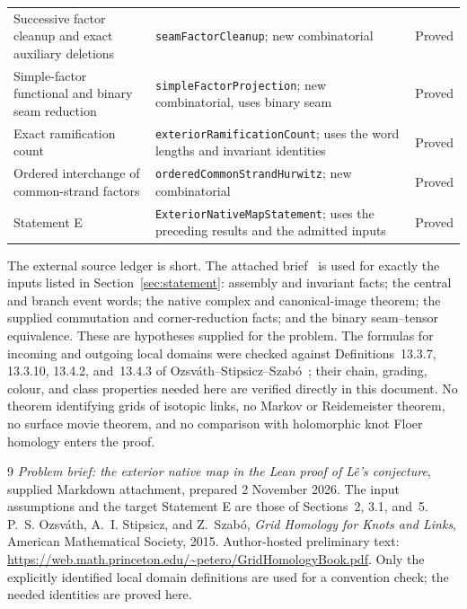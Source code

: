 \documentclass[11pt,a4paper]{article}
\theoremstyle{remark}
\begin{document}
\begin{longtable}{>{\raggedright\arraybackslash}p{}>{\raggedright\arraybackslash}p{}>{\raggedright\arraybackslash}p{}}
Successive factor cleanup and exact auxiliary deletions &
\texttt{seamFactorCleanup}; new combinatorial & Proved\\[3pt]
Simple-factor functional and binary seam reduction &
\texttt{simpleFactorProjection}; new combinatorial, uses binary seam & Proved\\[3pt]
Exact ramification count &
\texttt{exteriorRamificationCount}; uses the word lengths and invariant identities & Proved\\[3pt]
Ordered interchange of common-strand factors &
\texttt{orderedCommonStrandHurwitz}; new combinatorial & Proved\\[3pt]
Statement E &
\texttt{ExteriorNativeMapStatement}; uses the preceding results
and the admitted inputs & Proved\\
\bottomrule
\end{longtable}

The external source ledger is short.  The attached brief~\cite{brief}
is used for exactly the inputs listed in Section~\ref{sec:statement}:
assembly and invariant facts; the central and branch event words;
the native complex and canonical-image theorem; the supplied
commutation and corner-reduction facts; and the binary seam--tensor
equivalence.  These are hypotheses supplied for the problem.
The formulas for incoming and outgoing local domains were checked
against Definitions~13.3.7, 13.3.10, 13.4.2, and~13.4.3 of
Ozsv\'ath--Stipsicz--Szab\'o~\cite{OSS}; their chain, grading, colour,
and class properties needed here are verified directly in this
document.  No theorem identifying grids of isotopic links, no
Markov or Reidemeister theorem, no surface movie theorem, and no
comparison with holomorphic knot Floer homology enters the proof.

\begin{thebibliography}{9}
\emph{Problem brief: the exterior native map in the Lean proof of
L\^e's conjecture}, supplied Markdown attachment, prepared
2 November 2026.  The input assumptions and the target Statement E
are those of Sections~2, 3.1, and~5.
P.~S. Ozsv\'ath, A.~I. Stipsicz, and Z.~Szab\'o,
\emph{Grid Homology for Knots and Links},
American Mathematical Society, 2015.
Author-hosted preliminary text:
\url{https://web.math.princeton.edu/~petero/GridHomologyBook.pdf}.
Only the explicitly identified local domain definitions are used
for a convention check; the needed identities are proved here.
\end{thebibliography}
\end{document}
